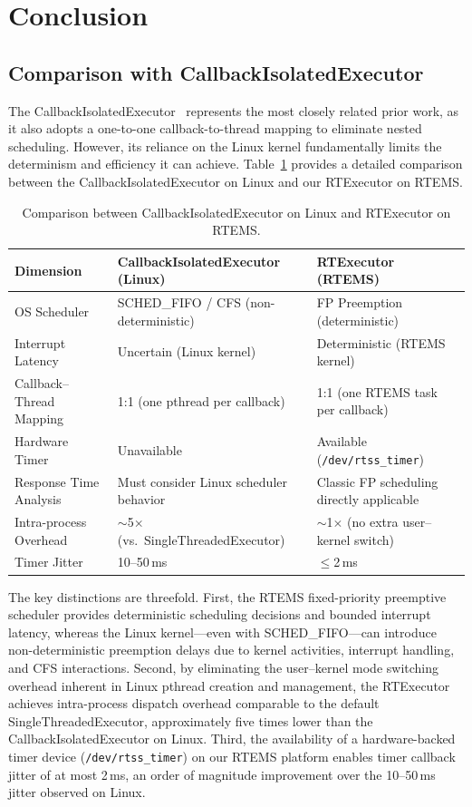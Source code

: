 \section{Conclusion}
\label{sec:conclusion}

\subsection{Comparison with CallbackIsolatedExecutor}

The CallbackIsolatedExecutor~\cite{ishikawa2025} represents the most closely related prior work, as it also adopts a one-to-one callback-to-thread mapping to eliminate nested scheduling. However, its reliance on the Linux kernel fundamentally limits the determinism and efficiency it can achieve. Table~\ref{tab:comparison} provides a detailed comparison between the CallbackIsolatedExecutor on Linux and our RTExecutor on RTEMS.

\begin{table}[t]
\centering
\caption{Comparison between CallbackIsolatedExecutor on Linux and RTExecutor on RTEMS.}
\label{tab:comparison}
\begin{tabular}{p{1.6cm} p{2.8cm} p{2.8cm}}
\toprule
\textbf{Dimension} & \textbf{CallbackIsolatedExecutor (Linux)} & \textbf{RTExecutor (RTEMS)} \\
\midrule
OS Scheduler & SCHED\_FIFO / CFS (non-deterministic) & FP Preemption (deterministic) \\
\midrule
Interrupt Latency & Uncertain (Linux kernel) & Deterministic (RTEMS kernel) \\
\midrule
Callback--Thread Mapping & 1:1 (one pthread per callback) & 1:1 (one RTEMS task per callback) \\
\midrule
Hardware Timer & Unavailable & Available (\texttt{/dev/rtss\_timer}) \\
\midrule
Response Time Analysis & Must consider Linux scheduler behavior & Classic FP scheduling directly applicable \\
\midrule
Intra-process Overhead & $\sim$5$\times$ (vs.\ SingleThreadedExecutor) & $\sim$1$\times$ (no extra user--kernel switch) \\
\midrule
Timer Jitter & 10--50\,ms & $\leq$2\,ms \\
\bottomrule
\end{tabular}
\end{table}

The key distinctions are threefold. First, the RTEMS fixed-priority preemptive scheduler provides deterministic scheduling decisions and bounded interrupt latency, whereas the Linux kernel---even with SCHED\_FIFO---can introduce non-deterministic preemption delays due to kernel activities, interrupt handling, and CFS interactions. Second, by eliminating the user--kernel mode switching overhead inherent in Linux pthread creation and management, the RTExecutor achieves intra-process dispatch overhead comparable to the default SingleThreadedExecutor, approximately five times lower than the CallbackIsolatedExecutor on Linux. Third, the availability of a hardware-backed timer device (\texttt{/dev/rtss\_timer}) on our RTEMS platform enables timer callback jitter of at most 2\,ms, an order of magnitude improvement over the 10--50\,ms jitter observed on Linux.

